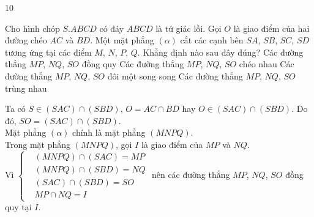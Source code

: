 \begin{indapan}{10}
\begin{ex}%
Cho hình chóp $S.ABCD$ có đáy $ABCD$ là tứ giác lồi. Gọi $O$ là giao điểm của hai đường chéo $AC$ và $BD$. Một mặt phẳng $(\alpha)$ cắt các cạnh bên $SA$, $SB$, $SC$, $SD$ tương ứng tại các điểm $M$, $N$, $P$, $Q$. Khẳng định nào sau đây đúng?
\choice
{\True Các đường thẳng $MP$, $NQ$, $SO$ đồng quy}
{Các đường thẳng $MP$, $NQ$, $SO$ chéo nhau}
{Các đường thẳng $MP$, $NQ$, $SO$ đôi một song song}
{Các đường thẳng $MP$, $NQ$, $SO$ trùng nhau}
\loigiai
{
\immini
{
Ta có $S\in (SAC)\cap (SBD)$, $O=AC\cap BD$ hay $O\in (SAC)\cap (SBD)$. Do đó, $SO=(SAC)\cap (SBD)$.\\
Mặt phẳng $(\alpha)$ chính là mặt phẳng $(MNPQ)$.\\
Trong mặt phẳng $(MNPQ)$, gọi $I$ là giao điểm của $MP$ và $NQ$.\\
Vì $\left\{\begin{aligned}&(MNPQ)\cap (SAC)=MP \\&(MNPQ)\cap (SBD)=NQ \\&(SAC)\cap (SBD)=SO \\&MP\cap NQ=I\end{aligned}\right.$ nên các đường thẳng $MP$, $NQ$, $SO$ đồng quy tại $I$.
}
{
}
}
\end{ex}


\end{indapan}
